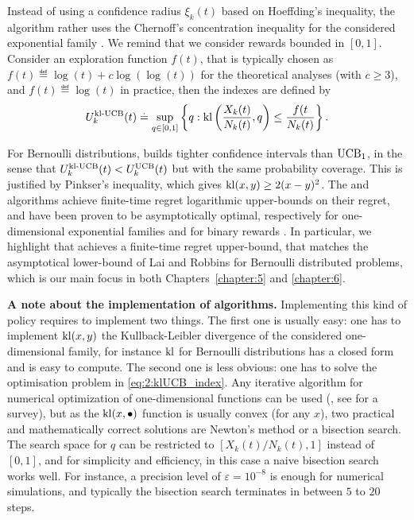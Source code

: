Instead of using a confidence radius $\xi_k(t)$ based on Hoeffding's inequality,
the \klUCB{} algorithm rather uses the Chernoff's concentration inequality for the considered exponential family \cite{chernoff1952measure,chernoff1981note}.
We remind that we consider rewards bounded in $[0,1]$.
Consider an exploration function $f(t)$,
that is typically chosen as $f(t) \eqdef \log(t)+c\log(\log(t))$ for the theoretical analyses (with $c \geq 3$),
and $f(t) \eqdef \log(t)$ in practice,
then the \klUCB{} indexes are defined by
\begin{align}\label{eq:2:klUCB_index}
    U_k^{\mathrm{kl}\text{-}\mathrm{UCB}}(t) \overset{.}{=} \sup\limits_{q \in [0, 1]} \left\{ q : \mathrm{kl}\left(\frac{X_k(t)}{N_k(t)}, q\right) \leq \frac{f(t}{N_k(t)} \right\}.
\end{align}

For Bernoulli distributions, \klUCB{} builds tighter confidence intervals than $\mathrm{UCB}_1$, in the sense that $U_k^{\mathrm{kl}\text{-}\mathrm{UCB}}(t) < U_k^{\mathrm{UCB}}(t)$
but with the same probability coverage.
This is justified by Pinkser's inequality, which gives $\mathrm{kl}(x,y) \geq 2(x-y)^2$.
%
The \KLUCB{} and \klUCB{} algorithms achieve finite-time regret logarithmic upper-bounds on their regret, and have been proven to be asymptotically optimal, respectively for one-dimensional exponential families and for binary rewards \cite{Garivier11KL,KLUCBJournal}.
In particular, we highlight that \klUCB{} achieves a finite-time regret upper-bound, that matches the asymptotical lower-bound of Lai and Robbins \cite{LaiRobbins85} for Bernoulli distributed problems, which is our main focus in both Chapters~\ref{chapter:5} and \ref{chapter:6}.


\textbf{A note about the implementation of \klUCB{} algorithms.}
%
Implementing this kind of policy requires to implement two things.
The first one is usually easy: one has to implement $\mathrm{kl}(x,y)$ the Kullback-Leibler divergence of the considered one-dimensional family,
for instance $\mathrm{kl}$ for Bernoulli distributions has a closed form and is easy to compute.
The second one is less obvious: one has to solve the optimisation problem in \eqref{eq:2:klUCB_index}.
Any iterative algorithm for numerical optimization of one-dimensional functions can be used (\eg, see \cite{BoydVanderberghe04} for a survey), but as the $\mathrm{kl}(x,\bullet)$ function is usually convex (for any $x$), two practical and mathematically correct solutions are Newton's method or a bisection search.
The search space for $q$ can be restricted to $[ X_k(t) / N_k(t), 1 ]$ instead of $[0,1]$,
and for simplicity and efficiency, in this case a naive bisection search works well.
For instance, a precision level of $\varepsilon=10^{-8}$ is enough for numerical simulations, and typically the bisection search terminates in between $5$ to $20$ steps.

